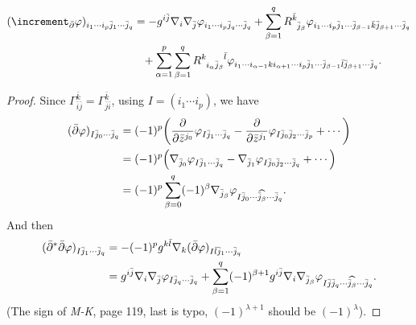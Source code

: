 \documentclass[12pt]{article}
\begin{document}
\begin{theorem}
  \begin{align*}
    (\lap_{\bar{\partial}}\vphi)_{i_1\cdots i_p\bar{j}_1\cdots\bar{j}_q}
    &=-g^{i\bar{j}}\nabla_i \nabla_{\bar{j}}\vphi_{i_1\cdots i_p\bar{j}_q\cdots
    \bar{j}_q}+\sum_{\beta=1}^q R\indices{^{\bar{k}}_{\bar{j}_\beta}}
    \vphi_{i_1\cdots i_p\bar{j}_1\cdots \bar{j}_{\beta-1}\bar{k}\bar{j}_{\beta+1}
    \cdots \bar{j}_q} \\
    &\phantom{=}+\sum_{\alpha=1}^{p}\sum_{\beta=1}^{q}R\indices{^k_{i_\alpha
    \bar{j}_\beta}^{\bar{l}}}\vphi_{i_1\cdots i_{\alpha-1}ki_{\alpha+1}\cdots
    i_p\bar{j}_1\cdots \bar{j}_{\beta-1}\bar{l}\bar{j}_{\beta+1}\cdots\bar{j}_q}
  .\end{align*}
\end{theorem}
\begin{proof}
  Since \(\Gamma_{\bar{i}\bar{j}}^{\bar{k}}=\Gamma_{\bar{j}\bar{i}}^{\bar{k}}\),
  using \(I=(i_1\cdots i_p)\), we have
  \begin{align*}
    (\bar{\partial}\vphi)_{I\bar{j}_0\cdots\bar{j}_q}&=(-1)^p\left(
    \pd{\bar{z}^{j_0}}\vphi_{I\bar{j}_1\cdots\bar{j}_q}-\pd{\bar{z}^{j_1}}
    \vphi_{I\bar{j}_0\bar{j}_2\cdots \bar{j}_p}+\cdots\right) \\
    &=(-1)^p\left(\nabla_{\bar{j}_0}\vphi_{I\bar{j}_1\cdots \bar{j}_q}-
    \nabla_{\bar{j}_1}\vphi_{I\bar{j}_0\bar{j}_2\cdots\bar{j}_q}+\cdots\right) \\
    &=(-1)^p \sum_{\beta=0}^{q}(-1)^\beta \nabla_{\bar{j}_\beta}
    \vphi_{I\bar{j}_0\cdots\widehat{\bar{j}_\beta}\cdots \bar{j}_q}
  .\end{align*}
  And then
  \begin{align*}
    (\bar{\partial}^*\bar{\partial}\varphi)_{I\bar{j}_1\cdots \bar{j}_q}
    &=-(-1)^p g^{k\bar{l}}\nabla_k (\bar{\partial}\varphi)_{I\bar{l}\bar{j}_1\cdots
    \bar{j}_q} \\
    &=g^{i\bar{j}}\nabla_i \nabla_{\bar{j}}\varphi_{I\bar{j}_q\cdots \bar{j}_q}
    +\sum_{\beta=1}^{q}(-1)^{\beta+1}g^{i\bar{j}}\nabla_i \nabla_{\bar{j}_\beta}
    \varphi_{I\bar{j}\bar{j}_q\cdots\widehat{\bar{j}_\beta}\cdots \bar{j}_q}
  .\end{align*}
  (The sign of \emph{M-K}, page 119, last is typo, \((-1)^{\lambda+1}\) should
  be \((-1)^\lambda\)).


\end{proof}
\end{document}
